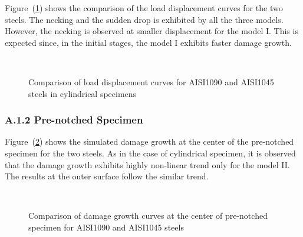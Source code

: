 Figure~(\ref{fig:chap8:load_disp_plot_cylinder_diff_coefficients}) shows the comparison of the load displacement curves for the two steels. The necking and the sudden drop is exhibited by all the three models. However, the necking is observed at smaller displacement for the model I. This is expected since, in the initial stages, the model I exhibits faster damage growth.
\begin{figure}[ht]
\centering
{} \\ %
{}
\caption{Comparison of load displacement curves for AISI1090 and AISI1045 steels in cylindrical specimens}
\label{fig:chap8:load_disp_plot_cylinder_diff_coefficients}
\end{figure}


\subsubsection*{A.1.2 Pre-notched Specimen}
Figure~(\ref{fig:chap8:damage_growth_prenecked_center_diff_coefficients}) shows the simulated damage growth at the center of the pre-notched specimen for the two steels. As in the case of cylindrical specimen, it is
observed that the damage growth exhibits highly non-linear trend only for the model II. The results at the outer surface follow the similar trend.
\begin{figure}[ht]
\centering
{} \\ %
\caption{Comparison of damage growth curves at the center of pre-notched specimen for AISI1090 and AISI1045 steels} \label{fig:chap8:damage_growth_prenecked_center_diff_coefficients}
\end{figure}

